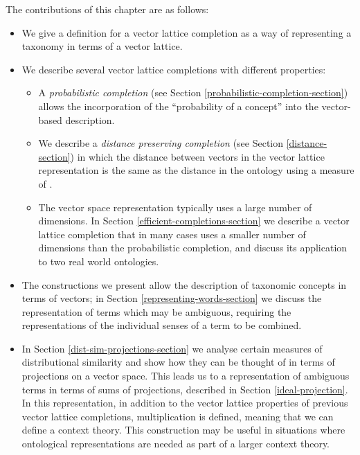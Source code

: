 The contributions of this chapter are as follows:
\begin{itemize}
\item We give a definition for a vector lattice completion as a way of representing a taxonomy in terms of a vector lattice.
\item We describe several vector lattice completions with different properties:
\begin{itemize}
\item A \emph{probabilistic completion} (see Section \ref{probabilistic-completion-section}) allows the incorporation of the ``probability of a concept'' into the vector-based description.
\item We describe a \emph{distance preserving completion} (see Section \ref{distance-section}) in which the distance between vectors in the vector lattice representation is the same as the distance in the ontology using a measure of \cite{Jiang:97}.
\item The vector space representation typically uses a large number of dimensions. In Section \ref{efficient-completions-section} we describe a vector lattice completion that in many cases uses a smaller number of dimensions than the probabilistic completion, and discuss its application to two real world ontologies.
\end{itemize}
\item The constructions we present allow the description of taxonomic concepts in terms of vectors; in Section \ref{representing-words-section} we discuss the representation of terms which may be ambiguous, requiring the representations of the individual senses of a term to be combined.
\item In Section \ref{dist-sim-projections-section} we analyse certain measures of distributional similarity and show how they can be thought of in terms of projections on a vector space. This leads us to a representation of ambiguous terms in terms of sums of projections, described in Section \ref{ideal-projection}. In this representation, in addition to the vector lattice properties of previous vector lattice completions, multiplication is defined, meaning that we can define a context theory. This construction may be useful in situations where ontological representations are needed as part of a larger context theory.
\end{itemize}

